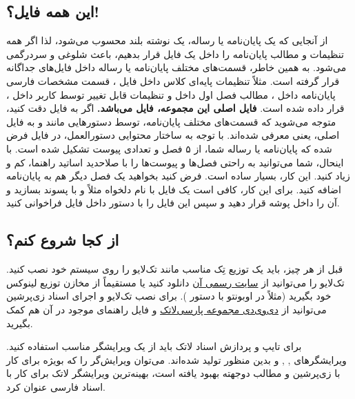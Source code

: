 \subsection{این همه فایل؟!}
\label{muchFiles}
از آنجایی که یک پایان‌نامه یا رساله، یک نوشته بلند محسوب می‌شود، لذا اگر همه تنظیمات و مطالب پایان‌نامه را داخل یک فایل قرار بدهیم، باعث شلوغی و سردرگمی می‌شود. به همین خاطر، قسمت‌های مختلف پایان‌نامه یا رساله  داخل فایل‌های جداگانه قرار گرفته است. مثلاً تنظیمات پایه‌ای کلاس داخل فایل
،
قسمت مشخصات فارسی پایان‌نامه داخل
،
مطالب فصل اول داخل
و تنظیمات قابل تغییر توسط کاربر داخل
،
قرار داده شده است.
\textbf{
	فایل اصلی این مجموعه، فایل
	می‌باشد.
}
اگر به فایل
دقت کنید، متوجه می‌شوید که قسمت‌های مختلف پایان‌نامه، توسط دستورهایی مانند
و
به فایل اصلی، یعنی
معرفی شده‌اند.
با توجه به ساختار محتوایی دستورالعمل، در فایل
فرض شده که پایان‌نامه یا رساله شما، از ۵ فصل و تعدادی پیوست تشکیل شده است. با اینحال، شما می‌توانید به راحتی فصل‌ها و پیوست‌ها را با صلاحدید اساتید راهنما، کم و زیاد کنید. این کار، بسیار ساده است. فرض کنید بخواهید یک فصل دیگر هم به پایان‌نامه اضافه کنید. برای این کار، کافی است یک فایل با نام دلخواه مثلاً
و با پسوند
بسازید و آن را داخل پوشه
قرار دهید و سپس این فایل را با دستور
\verb!!
داخل فایل
فراخوانی کنید.

\subsection{از کجا شروع کنم؟}
قبل از هر چیز، باید یک توزیع تِک مناسب مانند تک‌لایو
را روی سیستم خود نصب کنید. تک‌لایو  را می‌توانید از
\href{http://www.tug.org/texlive}{سایت رسمی آن}%
دانلود کنید یا مستقیماً از مخازن توزیع لینوکس خود بگیرید (مثلاً در اوبونتو با دستور
).
برای نصب تک‌لایو و اجرای اسناد زی‌پرشین می‌توانید از
\href{http://parsilatex.com/site/shop/}{دی‌وی‌دی مجموعه پارسی‌لاتک}%
و فایل راهنمای موجود در آن هم کمک بگیرید.

برای تایپ و پردازش اسناد لاتک باید از یک ویرایشگر مناسب استفاده کنید. ویرایشگرهای
,
,
و
بدین منظور تولید شده‌اند. می‌توان ویرایش‌گر
\href{https://bitbucket.org/srazi/biditexmaker3}{}%
را که بویژه برای کار با زی‌پرشین و مطالب دوجهته بهبود یافته است، بهینه‌ترین ویرایشگر لاتک برای کار با اسناد فارسی عنوان کرد.

